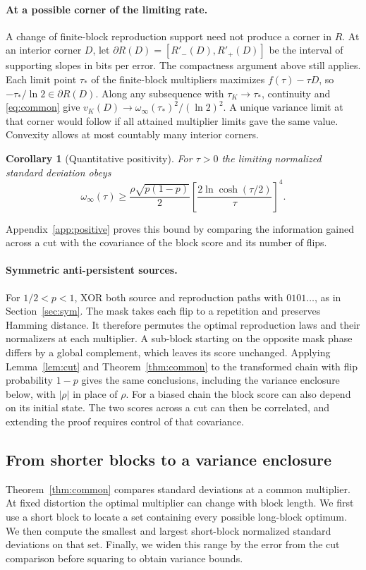 \documentclass[11pt,letterpaper]{article}
\newtheorem{corollary}[theorem]{Corollary}
\theoremstyle{definition}
\begin{document}
\paragraph{At a possible corner of the limiting rate.}
A change of finite-block reproduction support need not produce a corner in $R$. At an interior corner $D$, let $\partial R(D)=[R'_-(D),R'_+(D)]$ be the interval of supporting slopes in bits per error. The compactness argument above still applies. Each limit point $\tau_*$ of the finite-block multipliers maximizes $f(\tau)-\tau D$, so $-\tau_*/\ln2\in\partial R(D)$. Along any subsequence with $\tau_K\to\tau_*$, continuity and \eqref{eq:common} give $v_K(D)\to\omega_\infty(\tau_*)^2/(\ln2)^2$. A unique variance limit at that corner would follow if all attained multiplier limits gave the same value. Convexity allows at most countably many interior corners.


\begin{corollary}[Quantitative positivity]\label{cor:positive}
For $\tau>0$ the limiting normalized standard deviation obeys
\begin{equation}
 \omega_\infty(\tau)\ge\frac{\rho\sqrt{p(1-p)}}2
            \left[\frac{2\ln\cosh(\tau/2)}\tau\right]^4 .                \label{eq:lower}
\end{equation}
\end{corollary}
Appendix~\ref{app:positive} proves this bound by comparing the information gained across a cut with the covariance of the block score and its number of flips.

\paragraph{Symmetric anti-persistent sources.}
For $1/2<p<1$, XOR both source and reproduction paths with $0101\ldots$, as in Section~\ref{sec:sym}. The mask takes each flip to a repetition and preserves Hamming distance. It therefore permutes the optimal reproduction laws and their normalizers at each multiplier. A sub-block starting on the opposite mask phase differs by a global complement, which leaves its score unchanged. Applying Lemma~\ref{lem:cut} and Theorem~\ref{thm:common} to the transformed chain with flip probability $1-p$ gives the same conclusions, including the variance enclosure below, with $|\rho|$ in place of $\rho$. For a biased chain the block score can also depend on its initial state. The two scores across a cut can then be correlated, and extending the proof requires control of that covariance.
\subsection{From shorter blocks to a variance enclosure}\label{sec:shortvariance}
Theorem~\ref{thm:common} compares standard deviations at a common multiplier. At fixed distortion the optimal multiplier can change with block length. We first use a short block to locate a set containing every possible long-block optimum. We then compute the smallest and largest short-block normalized standard deviations on that set. Finally, we widen this range by the error from the cut comparison before squaring to obtain variance bounds.
\end{document}
